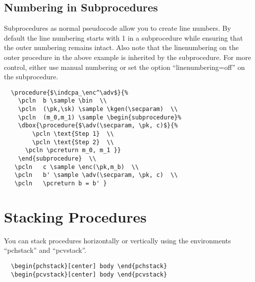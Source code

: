 \documentclass[a4paper]{report}
\begin{document}
  \subsection{Numbering in Subprocedures}
  Subprocedures as normal pseudocode allow you to create line numbers. By default the line numbering starts with 1 in a subprocedure while
  ensuring that the outer numbering remains intact. Also note that the linenumbering on the outer procedure in the above example is inherited
  by the subprocedure. For more control, either use manual numbering or set the option \enquote{linenumbering=off} on the subprocedure.
  
  \begin{center}
   \end{center}
	\begin{lstlisting}
  \procedure{$\indcpa_\enc^\adv$}{%
	\pcln  b \sample \bin  \\
	\pcln  (\pk,\sk) \sample \kgen(\secparam)  \\
	\pcln  (m_0,m_1) \sample \begin{subprocedure}%
	\dbox{\procedure{$\adv(\secparam, \pk, c)$}{%
		\pcln \text{Step 1}  \\
		\pcln \text{Step 2}  \\
	  \pcln \pcreturn m_0, m_1 }}
	\end{subprocedure}  \\
   \pcln   c \sample \enc(\pk,m_b)  \\
   \pcln   b' \sample \adv(\secparam, \pk, c)  \\
   \pcln   \pcreturn b = b' }
  \end{lstlisting}
  
  
  \section{Stacking Procedures}
  You can stack procedures horizontally or vertically using the environments \enquote{pchstack} and \enquote{pcvstack}. 
  \begin{lstlisting}
  \begin{pchstack}[center] body \end{pchstack}
  \begin{pcvstack}[center] body \end{pcvstack}
  \end{lstlisting}
  
\end{document}
